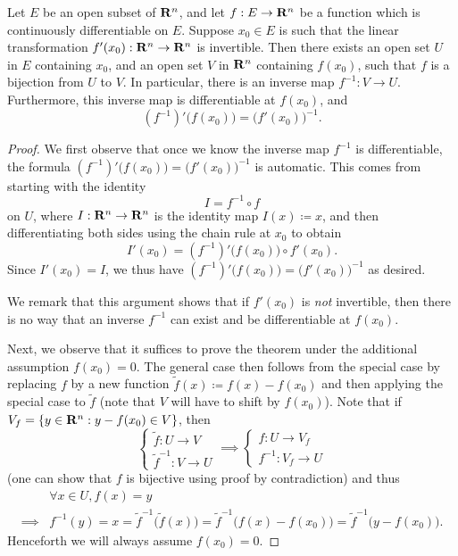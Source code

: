 \begin{theorem}\label{6.7.2}
  Let \(E\) be an open subset of \(\mathbf{R}^n\), and let \(f : E \to \mathbf{R}^n\) be a function which is continuously differentiable on \(E\).
  Suppose \(x_0 \in E\) is such that the linear transformation \(f'(x_0) : \mathbf{R}^n \to \mathbf{R}^n\) is invertible.
  Then there exists an open set \(U\) in \(E\) containing \(x_0\), and an open set \(V\) in \(\mathbf{R}^n\) containing \(f(x_0)\), such that \(f\) is a bijection from \(U\) to \(V\).
  In particular, there is an inverse map \(f^{-1} : V \to U\).
  Furthermore, this inverse map is differentiable at \(f(x_0)\), and
  \[
    (f^{-1})' \big(f(x_0)\big) = \big(f'(x_0)\big)^{-1}.
  \]
\end{theorem}

\begin{proof}
  We first observe that once we know the inverse map \(f^{-1}\) is differentiable, the formula \((f^{-1})' \big(f(x_0)\big) = \big(f'(x_0)\big)^{-1}\) is automatic.
  This comes from starting with the identity
  \[
    I = f^{-1} \circ f
  \]
  on \(U\), where \(I : \mathbf{R}^n \to \mathbf{R}^n\) is the identity map \(I(x) \coloneqq x\), and then differentiating both sides using the chain rule at \(x_0\) to obtain
  \[
    I'(x_0) = (f^{-1})' \big(f(x_0)\big) \circ f'(x_0).
  \]
  Since \(I'(x_0) = I\), we thus have \((f^{-1})' \big(f(x_0)\big) = \big(f'(x_0)\big)^{-1}\) as desired.

  We remark that this argument shows that if \(f'(x_0)\) is \emph{not} invertible, then there is no way that an inverse \(f^{-1}\) can exist and be differentiable at \(f(x_0)\).

  Next, we observe that it suffices to prove the theorem under the additional assumption \(f(x_0) = 0\).
  The general case then follows from the special case by replacing \(f\) by a new function \(\tilde{f}(x) \coloneqq f(x) - f(x_0)\) and then applying the special case to \(\tilde{f}\)
  (note that \(V\) will have to shift by \(f(x_0)\)).
  Note that if \(V_f = \{y \in \mathbf{R}^n : y - f(x_0) \in V\}\), then
  \[
    \begin{cases}
      \tilde{f} : U \to V \\
      \tilde{f}^{-1} : V \to U
    \end{cases} \implies \begin{cases}
      f : U \to V_f \\
      f^{-1} : V_f \to U
    \end{cases}
  \]
  (one can show that \(f\) is bijective using proof by contradiction)
  and thus
  \begin{align*}
             & \forall x \in U, f(x) = y                                                                                                          \\
    \implies & f^{-1}(y) = x = \tilde{f}^{-1}\big(\tilde{f}(x)\big) = \tilde{f}^{-1}\big(f(x) - f(x_0)\big) = \tilde{f}^{-1}\big(y - f(x_0)\big).
  \end{align*}
  Henceforth we will always assume \(f(x_0) = 0\).


\end{proof}
